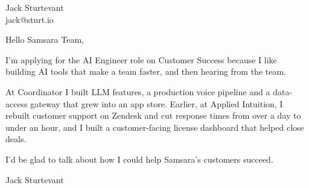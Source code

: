 \documentclass[11pt]{article}
\begin{document}
\raggedright

{\namefont\fontsize{20pt}{24pt}\selectfont Jack Sturtevant}\\[-0.3em]
jack@sturt.io

\vspace{1.2em}

Hello Samsara Team,

I'm applying for the AI Engineer role on Customer Success because I like building AI tools that make a team faster, and then hearing from the team.

At Coordinator I built LLM features, a production voice pipeline and a data-access gateway that grew into an app store. Earlier, at Applied Intuition, I rebuilt customer support on Zendesk and cut response times from over a day to under an hour, and I built a customer-facing license dashboard that helped close deals.

I'd be glad to talk about how I could help Samsara's customers succeed.

\vspace{0.6em}
Jack Sturtevant
\end{document}
